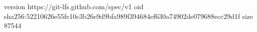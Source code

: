 version https://git-lfs.github.com/spec/v1
oid sha256:52210626e55fe10c3b26e9d9bfa989f394684ef630a74902de079688ecc29d1f
size 87544
